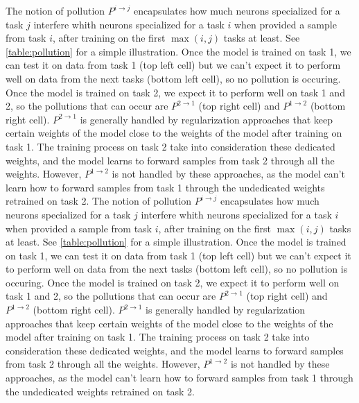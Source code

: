 \documentclass[twocolumn]{article}
\begin{document}
\vspace{1mm}
\noindent
The notion of pollution $P^{i\rightarrow j}$ encapsulates how much neurons specialized for a task $j$ interfere whith neurons specialized for a task $i$ when provided a sample from task $i$, after training on the first $\max(i,j)$ tasks at least. See \ref{table:pollution} for a simple illustration. Once the model is trained on task 1, we can test it on data from task 1 (top left cell) but we can't expect it to perform well on data from the next tasks (bottom left cell), so no pollution is occuring. Once the model is trained on task 2, we expect it to perform well on task 1 and 2, so the pollutions that can occur are $P^{2\rightarrow 1}$ (top right cell) and $P^{1\rightarrow 2}$ (bottom right cell). $P^{2\rightarrow 1}$ is generally handled by regularization approaches that keep certain weights of the model close to the weights of the model after training on task 1. The training process on task 2 take into consideration these dedicated weights, and the model learns to forward samples from task 2 through all the weights. However, $P^{1\rightarrow 2}$ is not handled by these approaches, as the model can't learn how to forward samples from task 1 through the undedicated weights retrained on task 2.
The notion of pollution $P^{i\rightarrow j}$ encapsulates how much neurons specialized for a task $j$ interfere whith neurons specialized for a task $i$ when provided a sample from task $i$, after training on the first $\max(i,j)$ tasks at least. See \ref{table:pollution} for a simple illustration. Once the model is trained on task 1, we can test it on data from task 1 (top left cell) but we can't expect it to perform well on data from the next tasks (bottom left cell), so no pollution is occuring. Once the model is trained on task 2, we expect it to perform well on task 1 and 2, so the pollutions that can occur are $P^{2\rightarrow 1}$ (top right cell) and $P^{1\rightarrow 2}$ (bottom right cell). $P^{2\rightarrow 1}$ is generally handled by regularization approaches that keep certain weights of the model close to the weights of the model after training on task 1. The training process on task 2 take into consideration these dedicated weights, and the model learns to forward samples from task 2 through all the weights. However, $P^{1\rightarrow 2}$ is not handled by these approaches, as the model can't learn how to forward samples from task 1 through the undedicated weights retrained on task 2.
\end{document}
